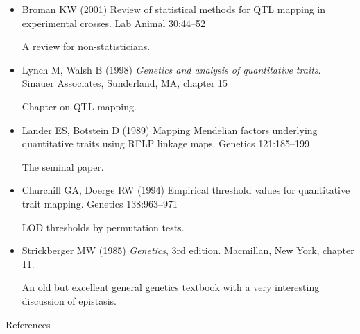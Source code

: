 \documentclass[12pt]{article}
\newcommand{\headsize}{\fontsize{35}{35} \selectfont}
\newcommand{\smallestsize}{\fontsize{18}{22} \selectfont}
\begin{document}
\hspace*{0.5in}
\begin{minipage}{9.5in}
\begin{itemize}
\itemsep12pt
\item Broman KW (2001) Review of statistical methods for QTL mapping in
experimental crosses. Lab Animal 30:44--52

{\color{myblue} A review for non-statisticians.}

\item Lynch M, Walsh B (1998) \emph{Genetics and analysis of quantitative
traits}. Sinauer Associates, Sunderland, MA, chapter 15

{\color{myblue} Chapter on QTL mapping.}

\item Lander ES, Botstein D (1989) Mapping Mendelian factors underlying
quantitative traits using RFLP linkage maps. Genetics
121:185--199

{\color{myblue} The seminal paper.}

\item Churchill GA, Doerge RW (1994) Empirical threshold values for
quantitative trait mapping. Genetics 138:963--971

{\color{myblue} LOD thresholds by permutation tests.}

\item Strickberger MW (1985) \emph{Genetics}, 3rd edition.  Macmillan,
New York, chapter 11.

{\color{myblue} An old but excellent general genetics textbook with a very
interesting discussion of epistasis.}


\end{itemize}
\end{minipage}


\newpage

\headsize \color{myyellow}
\hfill \begin{minipage}{5.75in}
\centering
References
\end{minipage}

\vspace*{15mm}

\color{mywhite} \smallestsize
\end{document}
